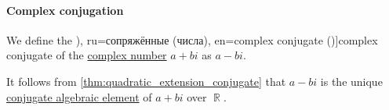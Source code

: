 \paragraph{Complex conjugation}

\begin{definition}\label{def:complex_conjugation}
  We define the \term[bg=(комплексно) спрегнато (число) (\cite[298]{ИлинСадовничиСендов1984АнализТом1}), ru=сопряжённые (числа), en=complex conjugate (\cite[7]{Ahlfors1979ComplexAnalysis})]{complex conjugate} of the \hyperref[def:complex_numbers]{complex number} \( a + bi \) as \( a - bi \).
\end{definition}
\begin{comments}
  \item It follows from \cref{thm:quadratic_extension_conjugate} that \( a - bi \) is the unique \hyperref[def:conjugate_algebraic_element]{conjugate algebraic element} of \( a + bi \) over \( \BbbR \).
\end{comments}

